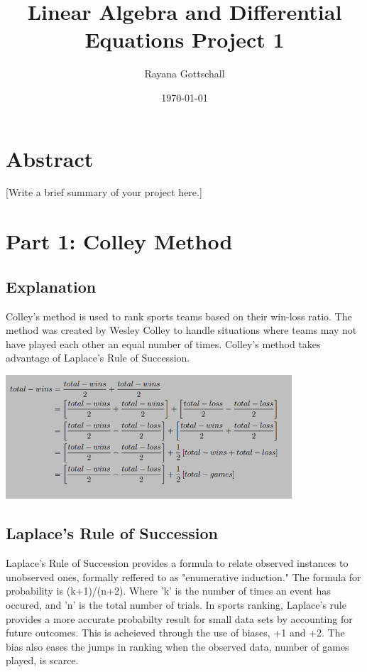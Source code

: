 \documentclass[12pt]{article}
\title{Linear Algebra and Differential Equations Project 1}
\author{Rayana Gottschall}
\date{\today}
\begin{document}
\maketitle
\newpage

\section*{Abstract}
[Write a brief summary of your project here.]

\section{Part 1: Colley Method}
\subsection{Explanation}
Colley's method is used to rank sports teams based on their win-loss ratio.
The method was created by Wesley Colley to handle situations where teams may 
not have played each other an equal number of times. Colley's method takes advantage
of Laplace's Rule of Succession.
\begin{center}
\includegraphics[width=0.8\textwidth]{colleysmethod.png}
\end{center}

\subsection{Laplace's Rule of Succession}
Laplace's Rule of Succession provides a formula to relate observed 
instances to unobserved ones, formally reffered to as "enumerative induction." 
The formula for probability is (k+1)/(n+2). Where 'k' is the number of times an 
event has occured, and 'n' is the total number of trials. 
In sports ranking, Laplace's rule provides a more accurate probabilty result for small data
 sets by accounting for future outcomes. 
This is acheieved through the use of biases, +1 and +2. 
The bias also eases the jumps in ranking when the observed data, number of games played, is
 scarce.
\end{document}
